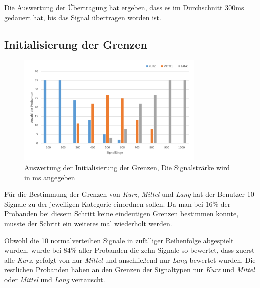 Die Auswertung der {\"U}bertragung hat ergeben, dass es im Durchschnitt 300ms gedauert hat, bis das Signal {\"u}bertragen worden ist.

\subsection{Initialisierung der Grenzen}
\label{ch:Evolution{\"a}rer Algorithmus:sec:Studiendesign}

\begin{figure}[htbp] 
            \centering
   	\includegraphics[width=0.8\textwidth]{pics/analyse/Initialisierung.png}
	\caption{Auswertung der Initialisierung der Grenzen, Die Signalstr{\"a}rke wird in ms angegeben}
	\label{fig:Initialisierung}
\end{figure}

F{\"u}r die Bestimmung der Grenzen von \textit{Kurz}, \textit{Mittel} und \textit{Lang} hat der Benutzer 10 Signale zu der jeweiligen Kategorie einordnen sollen. 
Da man bei 16\% der Probanden bei diesem Schritt keine eindeutigen Grenzen bestimmen konnte, musste der Schritt ein weiteres mal wiederholt werden. 

Obwohl die 10 normalverteilten Signale in zuf{\"a}lliger Reihenfolge abgespielt wurden, wurde bei 84\% aller Probanden die zehn Signale so bewertet, dass zuerst alle \textit{Kurz}, gefolgt von nur \textit{Mittel} und anschlie{\ss}end nur \textit{Lang} bewertet wurden. 
Die restlichen Probanden haben an den Grenzen der Signaltypen nur \textit{Kurz} und \textit{Mittel} oder \textit{Mittel} und \textit{Lang} vertauscht.


